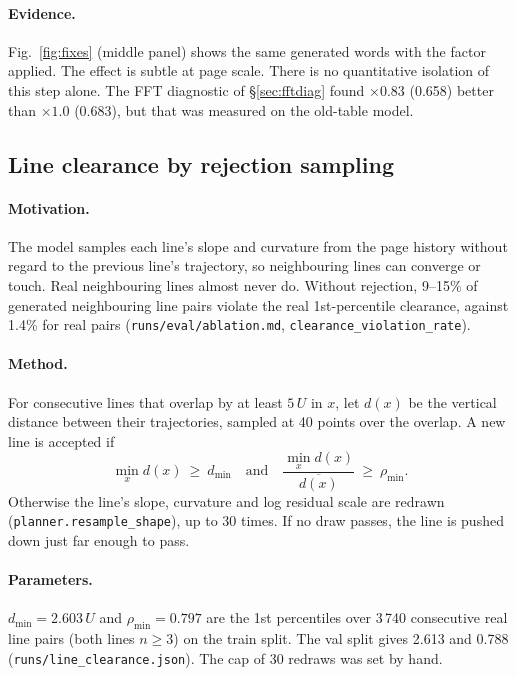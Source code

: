 \documentclass[11pt,a4paper]{article}
\newcommand{\U}{\ensuremath{U}}
\newcommand{\src}[1]{{\footnotesize\texttt{#1}}}
\begin{document}
\paragraph{Evidence.} Fig.~\ref{fig:fixes} (middle panel) shows the same
generated words with the factor applied. The effect is subtle at page scale.
There is no quantitative isolation of this step alone. The FFT diagnostic of
\S\ref{sec:fftdiag} found $\times0.83$ (0.658) better than $\times1.0$
(0.683), but that was measured on the old-table model.

\subsection{Line clearance by rejection sampling}
\label{sec:clear}
\paragraph{Motivation.} The model samples each line's slope and curvature
from the page history without regard to the previous line's trajectory, so
neighbouring lines can converge or touch. Real neighbouring lines almost never
do. Without rejection, 9--15\% of generated neighbouring line pairs violate the
real 1st-percentile clearance, against 1.4\% for real pairs
(\src{runs/eval/ablation.md}, \texttt{clearance\_violation\_rate}).

\paragraph{Method.} For consecutive lines that overlap by at least $5\,\U$ in
$x$, let $d(x)$ be the vertical distance between their trajectories, sampled at
40 points over the overlap. A new line is accepted if
\begin{equation}
\min_x d(x)\ \ge\ d_\text{min}\quad\text{and}\quad
\frac{\min_x d(x)}{\overline{d(x)}}\ \ge\ \rho_\text{min}.
\end{equation}
Otherwise the line's slope, curvature and log residual scale are redrawn
(\texttt{planner.resample\_shape}), up to 30 times. If no draw passes, the line
is pushed down just far enough to pass.

\paragraph{Parameters.} $d_\text{min}=2.603\,\U$ and $\rho_\text{min}=0.797$
are the 1st percentiles over 3\,740 consecutive real line pairs (both lines
$n\ge3$) on the train split. The val split gives 2.613 and 0.788
(\src{runs/line\_clearance.json}). The cap of 30 redraws was set by hand.
\end{document}
